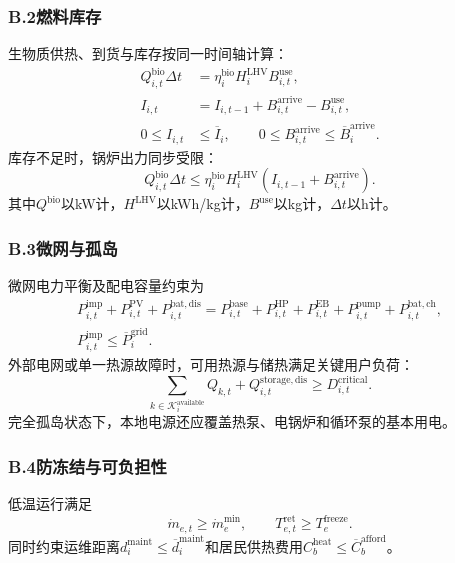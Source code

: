 \subsubsection*{B.2\quad 燃料库存}

生物质供热、到货与库存按同一时间轴计算：
\begin{align}
Q_{i,t}^{\mathrm{bio}}\Delta t&=\eta_i^{\mathrm{bio}}H_i^{\mathrm{LHV}}B_{i,t}^{\mathrm{use}},\\
I_{i,t}&=I_{i,t-1}+B_{i,t}^{\mathrm{arrive}}-B_{i,t}^{\mathrm{use}},\\
0\leq I_{i,t}&\leq\overline I_i,\qquad
0\leq B_{i,t}^{\mathrm{arrive}}\leq\overline B_i^{\mathrm{arrive}}.
\end{align}
库存不足时，锅炉出力同步受限：
\begin{equation}
Q_{i,t}^{\mathrm{bio}}\Delta t\leq\eta_i^{\mathrm{bio}}H_i^{\mathrm{LHV}}
(I_{i,t-1}+B_{i,t}^{\mathrm{arrive}}).
\end{equation}
其中$Q^{\mathrm{bio}}$以kW计，$H^{\mathrm{LHV}}$以kWh/kg计，$B^{\mathrm{use}}$以kg计，$\Delta t$以h计。

\subsubsection*{B.3\quad 微网与孤岛}

微网电力平衡及配电容量约束为
\begin{multline}
P_{i,t}^{\mathrm{imp}}+P_{i,t}^{\mathrm{PV}}+P_{i,t}^{\mathrm{bat,dis}}
=P_{i,t}^{\mathrm{base}}+P_{i,t}^{\mathrm{HP}}+P_{i,t}^{\mathrm{EB}}
+P_{i,t}^{\mathrm{pump}}+P_{i,t}^{\mathrm{bat,ch}},\\
P_{i,t}^{\mathrm{imp}}\leq\overline P_i^{\mathrm{grid}}.
\end{multline}
外部电网或单一热源故障时，可用热源与储热满足关键用户负荷：
\begin{equation}
\sum_{k\in\mathcal K_i^{\mathrm{available}}}Q_{k,t}
+Q_{i,t}^{\mathrm{storage,dis}}\geq D_{i,t}^{\mathrm{critical}}.
\end{equation}
完全孤岛状态下，本地电源还应覆盖热泵、电锅炉和循环泵的基本用电。

\subsubsection*{B.4\quad 防冻结与可负担性}

低温运行满足
\begin{equation}
\dot m_{e,t}\geq\dot m_e^{\min},\qquad
T_{e,t}^{\mathrm{ret}}\geq T_e^{\mathrm{freeze}}.
\end{equation}
同时约束运维距离$d_i^{\mathrm{maint}}\leq\overline d_i^{\mathrm{maint}}$和居民供热费用$C_b^{\mathrm{heat}}\leq\overline C_b^{\mathrm{afford}}$。

